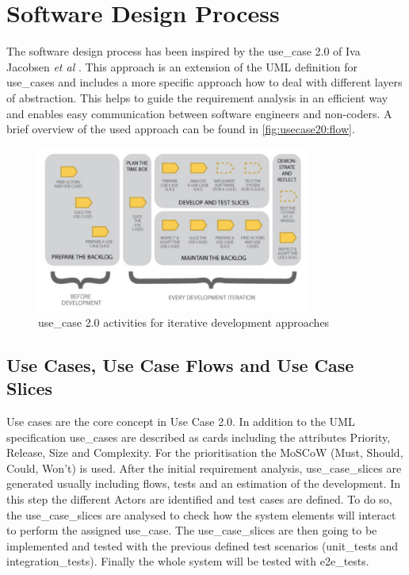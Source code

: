 \section{Software Design Process}
\label{sec:design}

The software design process has been inspired by the \Gls{use_case} 2.0 of Iva Jacobsen \textit{et al} \cite{jacobson2011usecase}. This approach is an extension of the \gls{UML} definition for \glspl{use_case} and includes a more specific approach how to deal with different layers of abstraction. This helps to guide the requirement analysis in an efficient way and enables easy communication between software engineers and non-coders. A brief overview of the used approach can be found in \autoref{fig:usecase20:flow}.

\begin{figure}[!ht]
\centering
\includegraphics[width=0.8\textwidth]{figures/uc20_flow}
\caption{\Gls{use_case} 2.0 activities for iterative development approaches \cite{jacobson2011usecase}}
\label{fig:usecase20:flow}
\end{figure}


\subsection{Use Cases, Use Case Flows and Use Case Slices}
Use cases are the core concept in Use Case 2.0. In addition to the \gls{UML} specification \glspl{use_case} are described as cards including the attributes Priority, Release, Size and Complexity. For the prioritisation the MoSCoW \cite{moscow} (Must, Should, Could, Won't) is used. After the initial requirement analysis, \glspl{use_case_slice} are generated usually including flows, tests and an estimation of the development. In this step the different \glspl{Actor} are identified and test cases are defined. To do so, the \glspl{use_case_slice} are analysed to check how the system elements will interact to perform the assigned \gls{use_case}. The \glspl{use_case_slice} are then going to be implemented and tested with the previous defined test scenarios (\glspl{unit_test} and \glspl{integration_test}). Finally the whole system will be tested with \glspl{e2e_test}.

